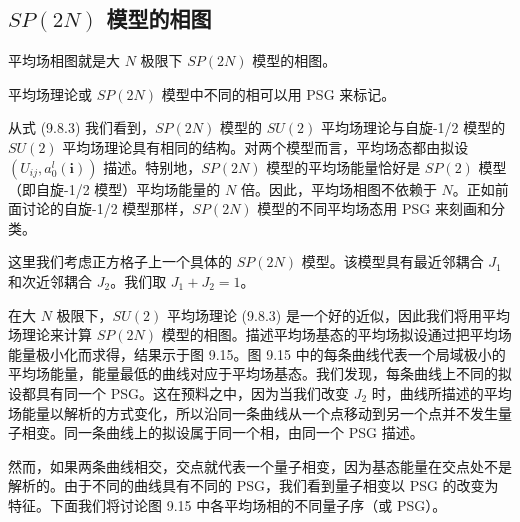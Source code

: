 \subsection{$SP(2N)$ 模型的相图}

\begin{keypoints}
\item 平均场相图就是大 $N$ 极限下 $SP(2N)$ 模型的相图。
\item 平均场理论或 $SP(2N)$ 模型中不同的相可以用 PSG 来标记。
\end{keypoints}

从式 (9.8.3) 我们看到，$SP(2N)$ 模型的 $SU(2)$ 平均场理论与自旋-1/2 模型的 $SU(2)$ 平均场理论具有相同的结构。对两个模型而言，平均场态都由拟设 $(U_{ij},a_0^l(\pmb{i}))$ 描述。特别地，$SP(2N)$ 模型的平均场能量恰好是 $SP(2)$ 模型（即自旋-1/2 模型）平均场能量的 $N$ 倍。因此，平均场相图不依赖于 $N$。正如前面讨论的自旋-1/2 模型那样，$SP(2N)$ 模型的不同平均场态用 PSG 来刻画和分类。

这里我们考虑正方格子上一个具体的 $SP(2N)$ 模型。该模型具有最近邻耦合 $J_1$ 和次近邻耦合 $J_2$。我们取 $J_1+J_2=1$。


在大 $N$ 极限下，$SU(2)$ 平均场理论 (9.8.3) 是一个好的近似，因此我们将用平均场理论来计算 $SP(2N)$ 模型的相图。描述平均场基态的平均场拟设通过把平均场能量极小化而求得，结果示于图 9.15。图 9.15 中的每条曲线代表一个局域极小的平均场能量，能量最低的曲线对应于平均场基态。我们发现，每条曲线上不同的拟设都具有同一个 PSG。这在预料之中，因为当我们改变 $J_2$ 时，曲线所描述的平均场能量以解析的方式变化，所以沿同一条曲线从一个点移动到另一个点并不发生量子相变。同一条曲线上的拟设属于同一个相，由同一个 PSG 描述。

然而，如果两条曲线相交，交点就代表一个量子相变，因为基态能量在交点处不是解析的。由于不同的曲线具有不同的 PSG，我们看到量子相变以 PSG 的改变为特征。下面我们将讨论图 9.15 中各平均场相的不同量子序（或 PSG）。

